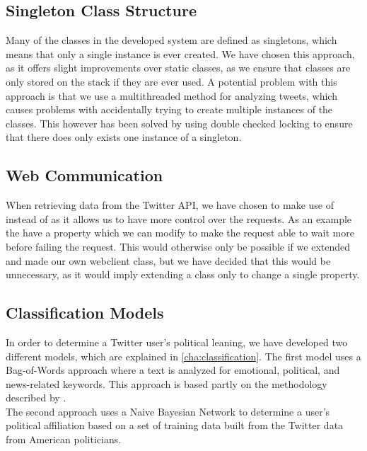 \subsection{Singleton Class Structure}
Many of the classes in the developed system are defined as singletons, which
means that only a single instance is ever created. We have chosen this approach,
as it offers slight improvements over static classes, as we ensure that classes
are only stored on the stack if they are ever used. A potential problem with
this approach is that we use a multithreaded method for analyzing tweets, which
causes problems with accidentally trying to create multiple instances of the
classes. This however has been solved by using double checked locking to ensure
that there does only exists one instance of a singleton.

\subsection{Web Communication}
When retrieving data from the Twitter API, we have chosen to make use of
 instead of  as it allows us to have
more control over the requests. As an example the  have a
 property which we can modify to make the request able to wait
more before failing the request. This would otherwise only be possible if we
extended  and made our own webclient class, but we have
decided that this would be unnecessary, as it would imply extending a class only to
change a single property.

\subsection{Classification Models}
In order to determine a Twitter user's political leaning, we have developed two
different models, which are explained in \autoref{cha:classification}. The first
model uses a Bag-of-Words approach where a text is analyzed for
emotional, political, and news-related keywords. This approach is based partly
on the methodology described by \citep{sarlan2014twitter}.\\
The second approach uses a Naive Bayesian Network to determine a user's
political affiliation based on a set of training data built from the Twitter
data from American politicians.

















